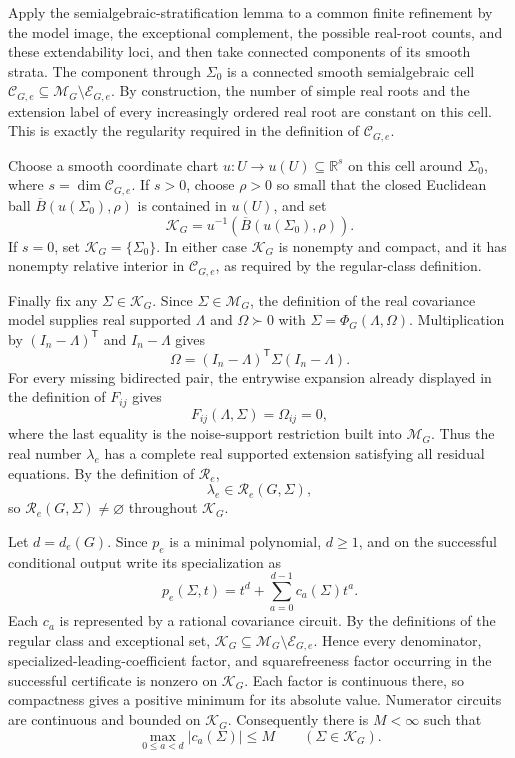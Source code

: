 Apply the semialgebraic-stratification lemma to a common finite refinement by the model image, the exceptional complement, the possible real-root counts, and these extendability loci, and then take connected components of its smooth strata.  The component through \(\Sigma_0\) is a connected smooth semialgebraic cell \(\mathcal C_{G,e}\subseteq\mathcal M_G\setminus\mathcal E_{G,e}\).  By construction, the number of simple real roots and the extension label of every increasingly ordered real root are constant on this cell.  This is exactly the regularity required in the definition of \(\mathcal C_{G,e}\).

Choose a smooth coordinate chart \(u:U\to u(U)\subseteq\mathbb R^s\) on this cell around \(\Sigma_0\), where \(s=\dim\mathcal C_{G,e}\).  If \(s>0\), choose \(\rho>0\) so small that the closed Euclidean ball \(\overline B(u(\Sigma_0),\rho)\) is contained in \(u(U)\), and set
\[
 \mathcal K_G
 =u^{-1}\!\left(\overline B(u(\Sigma_0),\rho)\right).         \tag{15}
\]
If \(s=0\), set \(\mathcal K_G=\{\Sigma_0\}\).  In either case \(\mathcal K_G\) is nonempty and compact, and it has nonempty relative interior in \(\mathcal C_{G,e}\), as required by the regular-class definition.

Finally fix any \(\Sigma\in\mathcal K_G\).  Since \(\Sigma\in\mathcal M_G\), the definition of the real covariance model supplies real supported \(\Lambda\) and \(\Omega\succ0\) with \(\Sigma=\Phi_G(\Lambda,\Omega)\).  Multiplication by \((I_n-\Lambda)^{\mathsf T}\) and \(I_n-\Lambda\) gives
\[
 \Omega=(I_n-\Lambda)^{\mathsf T}\Sigma(I_n-\Lambda).        \tag{16}
\]
For every missing bidirected pair, the entrywise expansion already displayed in the definition of \(F_{ij}\) gives
\[
 F_{ij}(\Lambda,\Sigma)=\Omega_{ij}=0,                          \tag{17}
\]
where the last equality is the noise-support restriction built into \(\mathcal M_G\).  Thus the real number \(\lambda_e\) has a complete real supported extension satisfying all residual equations.  By the definition of \(\mathcal R_e\),
\[
 \lambda_e\in\mathcal R_e(G,\Sigma),                           \tag{18}
\]
so \(\mathcal R_e(G,\Sigma)\ne\varnothing\) throughout \(\mathcal K_G\).

Let \(d=d_e(G)\).  Since \(p_e\) is a minimal polynomial, \(d\geq1\), and on the successful conditional output write its specialization as
\[
 p_e(\Sigma,t)=t^d+\sum_{a=0}^{d-1}c_a(\Sigma)t^a.              \tag{19}
\]
Each \(c_a\) is represented by a rational covariance circuit.  By the definitions of the regular class and exceptional set, \(\mathcal K_G\subseteq\mathcal M_G\setminus\mathcal E_{G,e}\).  Hence every denominator, specialized-leading-coefficient factor, and squarefreeness factor occurring in the successful certificate is nonzero on \(\mathcal K_G\).  Each factor is continuous there, so compactness gives a positive minimum for its absolute value.  Numerator circuits are continuous and bounded on \(\mathcal K_G\).  Consequently there is \(M<\infty\) such that
\[
 \max_{0\leq a<d}|c_a(\Sigma)|\leq M
 \qquad(\Sigma\in\mathcal K_G).                               \tag{20}
\]

